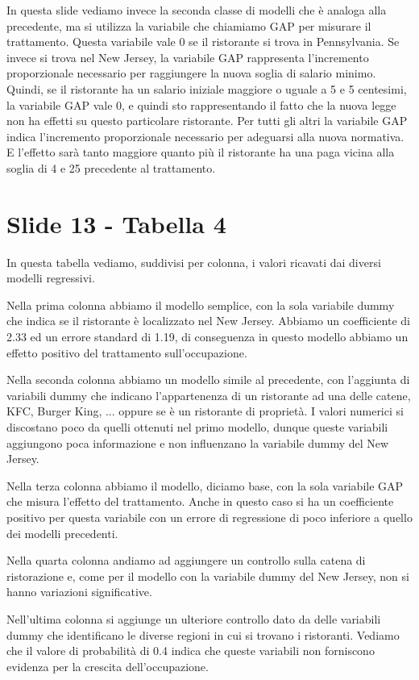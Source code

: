 \documentclass{article}
\begin{document}
In questa slide vediamo invece la seconda classe di modelli che è analoga alla precedente, ma si utilizza la variabile che chiamiamo GAP per misurare il trattamento. Questa variabile vale 0 se il ristorante si trova in Pennsylvania. Se invece si trova nel New Jersey, la variabile GAP rappresenta l'incremento proporzionale necessario per raggiungere la nuova soglia di salario minimo. Quindi, se il ristorante ha un salario iniziale maggiore o uguale a 5 e 5 centesimi, la variabile GAP vale 0, e quindi sto rappresentando il fatto che la nuova legge non ha effetti su questo particolare ristorante. Per tutti gli altri  la variabile GAP indica l'incremento proporzionale necessario per adeguarsi alla nuova normativa. E l'effetto sarà tanto maggiore quanto più il ristorante ha una paga vicina alla soglia di 4 e 25 precedente al trattamento.


\section{Slide 13 - Tabella 4}

In questa tabella vediamo, suddivisi per colonna, i valori ricavati dai diversi modelli regressivi.

Nella prima colonna abbiamo il modello semplice, con la sola variabile dummy che indica se il ristorante è localizzato nel New Jersey. Abbiamo un coefficiente di 2.33 ed un errore standard di 1.19, di conseguenza in questo modello abbiamo un effetto positivo del trattamento sull'occupazione.

Nella seconda colonna abbiamo un modello simile al precedente, con l'aggiunta di variabili dummy che indicano l'appartenenza di un ristorante ad una delle catene, KFC, Burger King, ... oppure se è un ristorante di proprietà. I valori numerici si discostano poco da quelli ottenuti nel primo modello, dunque queste variabili aggiungono poca informazione e non influenzano la variabile dummy del New Jersey.

Nella terza colonna abbiamo il modello, diciamo base, con la sola variabile GAP che misura l'effetto del trattamento. Anche in questo caso si ha un coefficiente positivo per questa variabile con un errore di regressione di poco inferiore a quello dei modelli precedenti.

Nella quarta colonna andiamo ad aggiungere un controllo sulla catena di ristorazione e, come per il modello con la variabile dummy del New Jersey, non si hanno variazioni significative.

Nell'ultima colonna si aggiunge un ulteriore controllo dato da delle variabili dummy che identificano le diverse regioni in cui si trovano i ristoranti. Vediamo che il valore di probabilità di 0.4 indica che queste variabili non forniscono evidenza per la crescita dell'occupazione.
\end{document}
